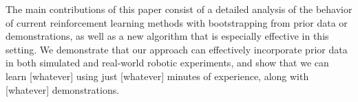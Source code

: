 The main contributions of this paper consist of a detailed analysis
of the behavior of current reinforcement learning methods with bootstrapping from prior data or demonstrations, as well as a new algorithm that is especially effective in this setting. We demonstrate that our approach can effectively incorporate prior data in both simulated and real-world robotic experiments, and show that we can learn [whatever] using just [whatever] minutes of experience, along with [whatever] demonstrations.





